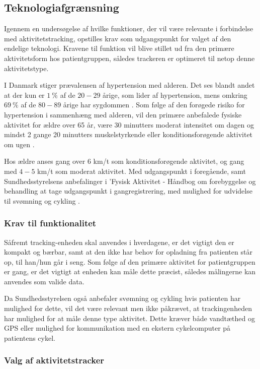 \subsection{Teknologiafgrænsning}

Igennem en undersøgelse af hvilke funktioner, der vil være relevante i forbindelse med aktivitetstracking, opstilles krav som udgangspunkt for valget af den endelige teknologi. Kravene til funktion vil blive stillet ud fra den primære aktivitetsform hos patientgruppen, således trackeren er optimeret til netop denne aktivitetstype.

I Danmark stiger prævalensen af hypertension med alderen. Det ses blandt andet at der kun er $1~\%$ af de $20-29$ årige, som lider af hypertension, mens omkring $69~\%$ af de $80-89$ årige har sygdommen \citep{olsen2015}. Som følge af den forøgede risiko for hypertension i sammenhæng med alderen, vil den primære anbefalede fysiske aktivitet for ældre over 65 år, være 30 minutters moderat intensitet om dagen og mindst 2 gange 20 minutters muskelstyrkende eller konditionsforøgende aktivitet om ugen \citep{pedersen2011}.

Hos ældre anses gang over $6$ km/t som konditionsforøgende aktivitet, og gang med $4-5$ km/t som moderat aktivitet. Med udgangspunkt i foregående, samt Sundhedsstyrelsens anbefalinger i 'Fysisk Aktivitet - Håndbog om forebyggelse og behandling at tage udgangspunkt i gangregistrering, med mulighed for udvidelse til svømning og cykling \citep{pedersen2011}.

\subsubsection{Krav til funktionalitet}

Såfremt tracking-enheden skal anvendes i hverdagene, er det vigtigt den er kompakt og bærbar, samt at den ikke har behov for opladning fra patienten står op, til han/hun går i seng. Som følge af den primære aktivitet for patientgruppen er gang, er det vigtigt at enheden kan måle dette præcist, således målingerne kan anvendes som valide data. 

Da Sundhedsstyrelsen også anbefaler svømning og cykling hvis patienten har mulighed for dette, vil det være relevant men ikke påkrævet, at trackingenheden har mulighed for at måle denne type aktivitet. Dette kræver både vandtæthed og GPS eller mulighed for kommunikation med en ekstern cykelcomputer på patientens cykel.

\subsubsection{Valg af aktivitetstracker}

